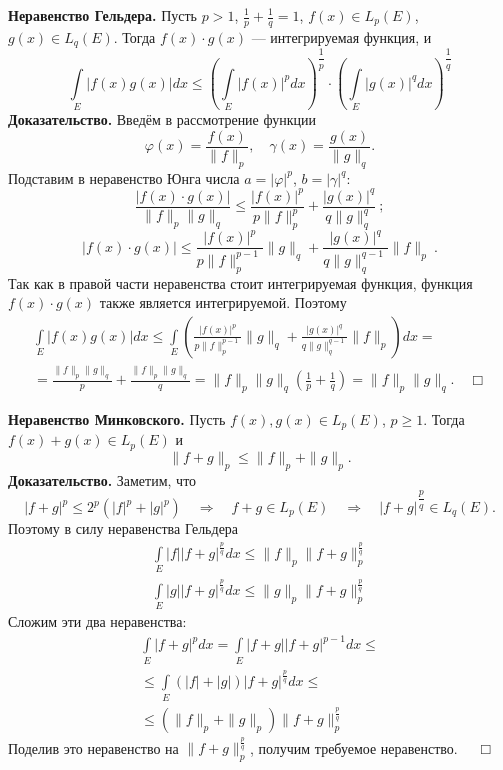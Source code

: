 \documentclass[12pt,a4paper, titlepage]{article}
\begin{document}
\textbf{Неравенство Гельдера.} Пусть $p > 1$, $\frac 1 p + \frac 1 q = 1$, $f(x) \in L_p(E)$, $g(x) \in L_q(E)$. Тогда $f(x) \cdot g(x)$ --- интегрируемая функция, и
$$
\int\limits_E |f(x) g(x)| dx \leqslant \left(\int\limits_E |f(x)|^p dx\right)^{\dfrac 1 p} \cdot \left(\int\limits_E |g(x)|^q dx\right)^{\dfrac 1 q}
$$
\textbf{Доказательство.} Введём в рассмотрение функции
$$
\varphi (x) = \frac {f(x)}{\|f\|_p}, \quad \gamma(x) = \frac {g(x)}{\|g\|_q}.
$$
Подставим в неравенство Юнга числа $a = |\varphi|^p$, $b = |\gamma|^q$:
$$
\frac{|f(x)\cdot g(x)|}{\|f\|_p\|g\|_q} \leqslant \frac {|f(x)|^p}{p\|f\|_p^p} + \frac{|g(x)|^q}{q\|g\|_q^q} \ ;
$$
$$
|f(x)\cdot g(x)| \leqslant \frac {|f(x)|^p}{p\|f\|_p^{p-1}} \|g\|_q + \frac{|g(x)|^q}{q\|g\|_q^{q-1}} \|f\|_p \ .
$$
Так как в правой части неравенства стоит интегрируемая функция, функция $f(x) \cdot g(x)$ также является интегрируемой. Поэтому
\begin{multline*}
\int\limits_E |f(x) g(x)| dx \leqslant \int\limits_E \left( \frac {|f(x)|^p}{p\|f\|_p^{p-1}} \|g\|_q + \frac{|g(x)|^q}{q\|g\|_q^{q-1}} \|f\|_p \right)dx = \\
= \frac {\|f\|_p \|g\|_q}{p} + \frac {\|f\|_p \|g\|_q}{q} = \|f\|_p \|g\|_q \left(\frac 1 p + \frac 1 q \right) = \|f\|_p \|g\|_q. \quad \Box
\end{multline*}

\textbf{Неравенство Минковского.} Пусть $f(x), g(x) \in L_p(E)$, $p \geqslant 1$. Тогда $f(x) + g(x) \in L_p(E)$ и
$$
\|f+g\|_p \leqslant \|f\|_p + \|g\|_p.
$$
\textbf{Доказательство.} Заметим, что
$$
|f+g|^p \leqslant 2^p (|f|^p + |g|^p) \quad \Rightarrow \quad f+g \in L_p(E) \quad \Rightarrow \quad |f+g|^{\dfrac p q} \in L_q(E).
$$
Поэтому в силу неравенства Гельдера
$$
\begin{matrix}
\int\limits_E |f||f+g|^{\frac p q} dx \leqslant \|f\|_p \|f+g\|^{\frac p q}_p \\
\int\limits_E |g||f+g|^{\frac p q} dx \leqslant \|g\|_p \|f+g\|_p^{\frac p q}
\end{matrix}
$$
Сложим эти два неравенства:
\begin{multline*}
\int\limits_E |f+g|^p dx = \int\limits_E |f+g| |f+g|^{p-1} dx \leqslant \\
\leqslant \int\limits_E(|f| + |g|) |f + g|^{\frac p q} dx \leqslant \\
\leqslant (\|f\|_p + \|g\|_p)\|f+g\|^{\frac p q}_p
\end{multline*}
Поделив это неравенство на $\|f+g\|^{\frac p q}_p$, получим требуемое неравенство. $\quad \Box$\\
\end{document}

